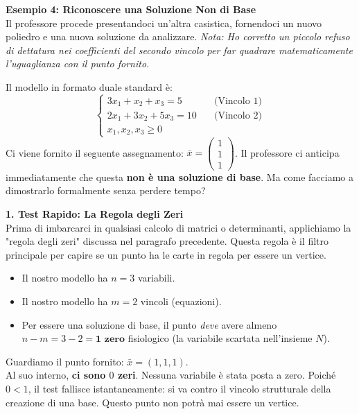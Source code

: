 \documentclass[12pt, a4paper]{article}
\begin{document}
	\vspace{0.6cm}
	\textbf{Esempio 4: Riconoscere una Soluzione Non di Base}\\
	Il professore procede presentandoci un'altra casistica, fornendoci un nuovo poliedro e una nuova soluzione da analizzare. 
	\textit{Nota: Ho corretto un piccolo refuso di dettatura nei coefficienti del secondo vincolo per far quadrare matematicamente l'uguaglianza con il punto fornito.}
	
	Il modello in formato duale standard è:
	\[
	\begin{cases}
		3x_1 + x_2 + x_3 = 5 \quad &\text{(Vincolo 1)} \\
		2x_1 + 3x_2 + 5x_3 = 10 \quad &\text{(Vincolo 2)} \\
		x_1, x_2, x_3 \geq 0
	\end{cases}
	\]
	Ci viene fornito il seguente assegnamento: $\bar{x} = \begin{pmatrix} 1 \\ 1 \\ 1 \end{pmatrix}$. 
	Il professore ci anticipa immediatamente che questa \textbf{non è una soluzione di base}. Ma come facciamo a dimostrarlo formalmente senza perdere tempo?
	
	\vspace{0.4cm}
	\textbf{1. Test Rapido: La Regola degli Zeri}\\
	Prima di imbarcarci in qualsiasi calcolo di matrici o determinanti, applichiamo la "regola degli zeri" discussa nel paragrafo precedente. Questa regola è il filtro principale per capire se un punto ha le carte in regola per essere un vertice.
	\begin{itemize}[label=\textcolor{titlecolor}{\Large\textbullet}, itemsep=2pt, leftmargin=1.5cm]
		\item Il nostro modello ha \textbf{$n = 3$} variabili.
		\item Il nostro modello ha \textbf{$m = 2$} vincoli (equazioni).
		\item Per essere una soluzione di base, il punto \textit{deve} avere almeno $n - m = 3 - 2 = \textbf{1 zero}$ fisiologico (la variabile scartata nell'insieme $N$).
	\end{itemize}
	Guardiamo il punto fornito: $\bar{x} = (1, 1, 1)$. \\
	Al suo interno, \textbf{ci sono $0$ zeri}. Nessuna variabile è stata posta a zero. 
	Poiché $0 < 1$, il test fallisce istantaneamente: si va contro il vincolo strutturale della creazione di una base. Questo punto non potrà mai essere un vertice.
	
\end{document}
